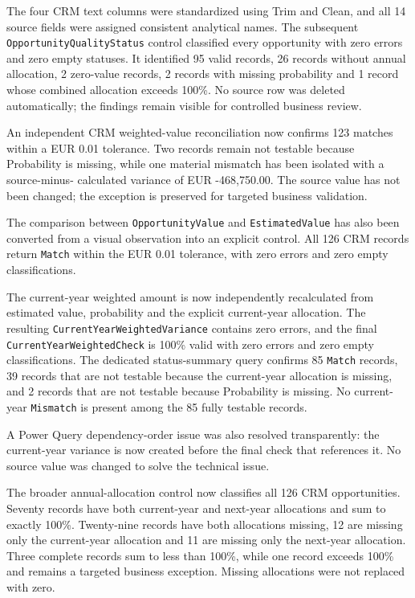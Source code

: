 \documentclass[11pt,a4paper]{article}
\begin{document}
\begin{summarybox}
The four CRM text columns were standardized using Trim and Clean, and all 14
source fields were assigned consistent analytical names. The subsequent
\texttt{OpportunityQualityStatus} control classified every opportunity with
zero errors and zero empty statuses. It identified 95 valid records, 26 records
without annual allocation, 2 zero-value records, 2 records with missing
probability and 1 record whose combined allocation exceeds 100\%. No source row
was deleted automatically; the findings remain visible for controlled business
review.

An independent CRM weighted-value reconciliation now confirms 123 matches
within a EUR 0.01 tolerance. Two records remain not testable because Probability
is missing, while one material mismatch has been isolated with a source-minus-
calculated variance of EUR -468,750.00. The source value has not been changed;
the exception is preserved for targeted business validation.

The comparison between \texttt{OpportunityValue} and \texttt{EstimatedValue}
has also been converted from a visual observation into an explicit control. All
126 CRM records return \texttt{Match} within the EUR 0.01 tolerance, with zero
errors and zero empty classifications.

The current-year weighted amount is now independently recalculated from
estimated value, probability and the explicit current-year allocation. The
resulting \texttt{CurrentYearWeightedVariance} contains zero errors, and the
final \texttt{CurrentYearWeightedCheck} is 100\% valid with zero errors and zero
empty classifications. The dedicated status-summary query confirms 85
\texttt{Match} records, 39 records that are not testable because the current-year
allocation is missing, and 2 records that are not testable because Probability
is missing. No current-year \texttt{Mismatch} is present among the 85 fully
testable records.

A Power Query dependency-order issue was also resolved transparently: the
current-year variance is now created before the final check that references it.
No source value was changed to solve the technical issue.

The broader annual-allocation control now classifies all 126 CRM opportunities.
Seventy records have both current-year and next-year allocations and sum to
exactly 100\%. Twenty-nine records have both allocations missing, 12 are missing
only the current-year allocation and 11 are missing only the next-year
allocation. Three complete records sum to less than 100\%, while one record
exceeds 100\% and remains a targeted business exception. Missing allocations
were not replaced with zero.


\end{summarybox}
\end{document}
